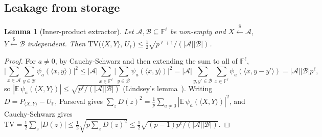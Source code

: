 \documentclass[10.5pt,a4paper]{article}
\theoremstyle{plain}
\newtheorem{lemma}[theorem]{Lemma}
\theoremstyle{definition}
\newcommand{\F}{\mathbb{F}}
\newcommand{\ip}[2]{\langle #1,#2\rangle}
\newcommand{\TV}{\mathrm{TV}}
\newcommand{\getsr}{\xleftarrow{\$}}
\begin{document}
\subsection{Leakage from storage}

\begin{lemma}[Inner-product extractor]\label{lem:lindsey}
Let $\mathcal A,\mathcal B\subseteq\F^\ell$ be non-empty and $X\getsr\mathcal A$, $Y\getsr\mathcal B$ independent. Then
$\TV\big(\ip XY,\,U_\F\big)\le\frac12\sqrt{p^{\ell+1}/(|\mathcal A||\mathcal B|)}$.
\end{lemma}
\begin{proof}
For $a\neq0$, by Cauchy-Schwarz and then extending the sum to all of $\F^\ell$,
\[
\Big|\sum_{x\in\mathcal A}\sum_{y\in\mathcal B}\psi_a(\ip xy)\Big|^2\le|\mathcal A|\sum_{x\in\F^\ell}\Big|\sum_{y\in\mathcal B}\psi_a(\ip xy)\Big|^2=|\mathcal A|\sum_{y,y'\in\mathcal B}\sum_{x\in\F^\ell}\psi_a(\ip x{y-y'})=|\mathcal A||\mathcal B|p^\ell,
\]
so $|\mathbb E\,\psi_a(\ip XY)|\le\sqrt{p^\ell/(|\mathcal A||\mathcal B|)}$ (Lindsey's lemma~\cite{chor88}). Writing $D=P_{\ip XY}-U_\F$, Parseval gives $\sum_z D(z)^2=\frac1p\sum_{a\neq0}|\mathbb E\,\psi_a(\ip XY)|^2$, and Cauchy-Schwarz gives $\TV=\frac12\sum_z|D(z)|\le\frac12\sqrt{p\sum_zD(z)^2}\le\frac12\sqrt{(p-1)p^\ell/(|\mathcal A||\mathcal B|)}$.
\end{proof}
\end{document}
